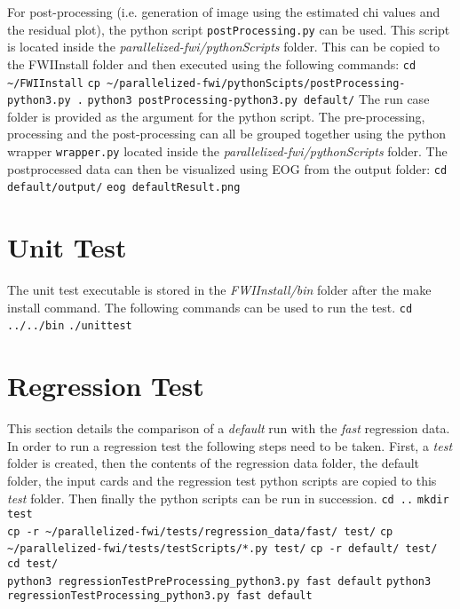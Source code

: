 \documentclass[10pt]{article}
\begin{document}
\noindent For post-processing (i.e. generation of image using the estimated chi values and the residual plot), the python script \texttt{postProcessing.py} can be used. This script is located inside the \textit{parallelized-fwi/pythonScripts} folder. This can be copied to the FWIInstall folder and then executed using the following commands:
\newline
\texttt{cd \textasciitilde/FWIInstall}
\newline
\texttt{cp \textasciitilde/parallelized-fwi/pythonScipts/postProcessing-python3.py .}
\newline
\texttt{python3 postProcessing-python3.py default/}
\newline
The run case folder is provided as the argument for the python script. The pre-processing, processing and the post-processing can all be grouped together using the python wrapper \texttt{wrapper.py} located inside the \textit{parallelized-fwi/pythonScripts} folder.
\noindent The postprocessed data can then be visualized using EOG from the output folder:
\newline
\texttt{cd default/output/}
\newline
\texttt{eog defaultResult.png}
\newline
 
\section{Unit Test}
The unit test executable is stored in the \textit{FWIInstall/bin} folder after the make install command. The following commands can be used to run the test.
\newline
\texttt{cd ../../bin}
\newline
\texttt{./unittest}
\section{Regression Test}
This section details the comparison of a \textit{default} run with the \textit{fast} regression data. In order to run a regression test the following steps need to be taken. First, a \textit{test} folder is created, then the contents of the regression data folder, the default folder, the input cards and the regression test python scripts are copied to this \textit{test} folder. Then finally the python scripts can be run in succession.  
\newline
\texttt{cd ..}
\newline
\texttt{mkdir test}
\\
\texttt{cp -r \textasciitilde/parallelized-fwi/tests/regression\_data/fast/ test/}
\newline
\texttt{cp \textasciitilde/parallelized-fwi/tests/testScripts/*.py test/}
\newline
\texttt{cp -r default/ test/}
\\
\texttt{cd test/}
\\
\texttt{python3 regressionTestPreProcessing\_python3.py fast default}
\newline
\texttt{python3 regressionTestProcessing\_python3.py fast default}
\end{document}
